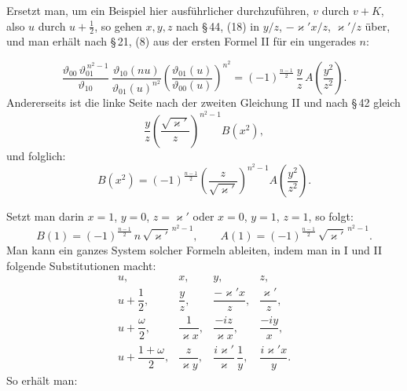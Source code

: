 Ersetzt man, um ein Beispiel hier ausführlicher durchzuführen,
$v$ durch $v + K$, also $u$ durch $u + \frac{1}{2}$, so gehen $x, y, z$ nach
\S\,44, (18) in $y/z$, $-\varkappa' x/z$, $\varkappa'/z$ über, und man erhält nach
\S\,21, (8) aus der ersten Formel II für ein ungerades $n$:

\[
\frac{\vartheta_{00}\,\vartheta_{01}^{\,n^2-1}}{\vartheta_{10}}\,
\frac{\vartheta_{10}(nu)}{\vartheta_{01}(u)^{n^2}}
\left(\frac{\vartheta_{01}(u)}{\vartheta_{00}(u)}\right)^{n^2}
= (-1)^{\frac{n-1}{2}}\,\frac{y}{z}\,A\!\left(\frac{y^2}{z^2}\right).
\]
Andererseits ist die linke Seite nach der zweiten Gleichung II
und nach \S\,42 gleich
\[
\frac{y}{z}\left(\frac{\sqrt{\varkappa'}}{z}\right)^{n^2-1} B(x^2),
\]
und folglich:
\[
B(x^2) = (-1)^{\frac{n-1}{2}}\left(\frac{z}{\sqrt{\varkappa'}}\right)^{n^2-1} A\!\left(\frac{y^2}{z^2}\right).
\]

Setzt man darin $x = 1$, $y = 0$, $z = \varkappa'$ oder $x = 0$, $y = 1$,
$z = 1$, so folgt:
\[
B(1) = (-1)^{\frac{n-1}{2}}\, n\, \sqrt{\varkappa'}^{\,n^2-1}, \qquad
A(1) = (-1)^{\frac{n-1}{2}}\, \sqrt{\varkappa'}^{\,n^2-1}.
\]
Man kann ein ganzes System solcher Formeln ableiten, indem
man in I und II folgende Substitutionen macht:
\[
\begin{array}{cccc}
u, & x, & y, & z, \\[6pt]
u+\dfrac{1}{2}, & \dfrac{y}{z}, & \dfrac{-\varkappa' x}{z}, & \dfrac{\varkappa'}{z}, \\[10pt]
u+\dfrac{\omega}{2}, & \dfrac{1}{\varkappa x}, & \dfrac{-iz}{\varkappa x}, & \dfrac{-iy}{x}, \\[10pt]
u+\dfrac{1+\omega}{2}, & \dfrac{z}{\varkappa y}, & \dfrac{i\varkappa'}{\varkappa}\,\dfrac{1}{y}, & \dfrac{i\varkappa' x}{y}.
\end{array}
\]
So erhält man:
